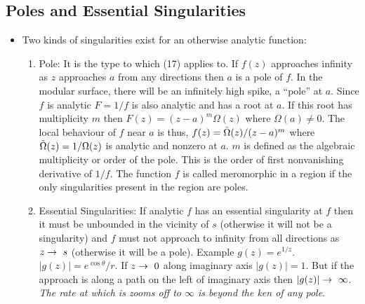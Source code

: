 \documentclass[12pt]{article}
\def\tt{\textit}
\def\td{\ensuremath\tilde}
\def\rto{\ensuremath\rightarrow\ }
\begin{document}
\subsection{Poles and Essential Singularities}
\begin{itemize}
    \item Two kinds of singularities exist for an otherwise analytic function:
    \begin{enumerate}
        \item Pole: It is the type to which (17) applies to. If $f(z)$ approaches infinity as $z$ approaches $a$ from any directions then $a$ is a pole of $f$. In the modular surface, there will be an infinitely high spike, a ``pole'' at $a$. Since $f$ is analytic $F=1/f$ is also analytic and has a root at $a$. If this root has multiplicity $m$ then $F(z)=(z-a)^m\Omega(z)$ where $\Omega(a)\neq 0$. The local behaviour of $f$ near $a$ is thus, $f(z)=\td{\Omega}(z)/(z-a)^m$ where $\td{\Omega}(z)=1/\Omega(z)$ is analytic and nonzero at $a$. $m$ is defined as the algebraic multiplicity or order of the pole. This is the order of first nonvanishing derivative of $1/f$. The function $f$ is called meromorphic in a region if the only singularities present in the region are poles.
        \item Essential Singularities: If analytic $f$ has an essential singularity at $f$ then it must be unbounded in the vicinity of $s$ (otherwise it will not be a singularity) and $f$ must not approach to infinity from all directions as $z\rto s$ (otherwise it will be a pole). Example $g(z)=e^{1/z}$. $|g(z)|=e^{\cos\theta}/r$. If $z\rto 0$ along imaginary axis $|g(z)|=1$. But if the approach is along a path on the left of imaginary axis then $|g(z)|\rto\infty$. \tt{The rate at which is zooms off to $\infty$ is beyond the ken of any pole}.
    \end{enumerate}
\end{itemize}
\end{document}
